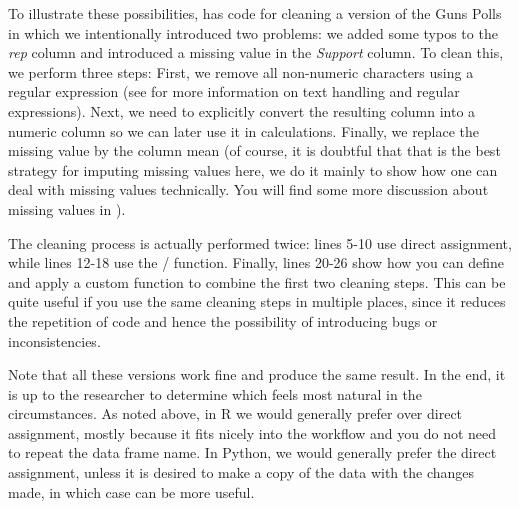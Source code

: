 

To illustrate these possibilities,  has code for cleaning a version of the Guns Polls
in which we intentionally introduced two problems: we added some typos to the \emph{rep} column
and introduced a missing value in the \emph{Support} column.
To clean this, we perform three steps: First, we remove all non-numeric characters using a regular expression
(see  for more information on text handling and regular expressions).
Next, we need to explicitly convert the resulting column into a numeric column so we can later use it in calculations.
Finally, we replace the missing value by the column mean
(of course, it is doubtful that that is the best strategy for imputing missing values here,
we do it mainly to show how one can deal with missing values technically. You will find some more discussion about missing values in ).

The cleaning process is actually performed twice: lines 5-10 use direct assignment,
while lines 12-18 use the / function.
Finally, lines 20-26 show how you can define and apply a custom function to combine the first two cleaning steps.
This can be quite useful if you use the same cleaning steps in multiple places,
since it reduces the repetition of code and hence the possibility of introducing bugs or inconsistencies. 

Note that all these versions work fine and produce the same result.
In the end, it is up to the researcher to determine which feels most natural in the circumstances.
As noted above, in R we would generally prefer  over direct assignment,
mostly because it fits nicely into the  workflow and you do not need to repeat the data frame name.
In Python, we would generally prefer the direct assignment, unless it is desired to make a copy of the data
with the changes made, in which case  can be more useful. 



